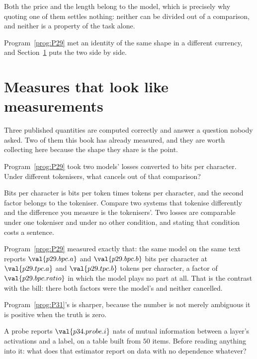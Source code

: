 \begin{fr}
Both the price and the length belong to the model, which is precisely why
quoting one of them settles nothing: neither can be divided out of a
comparison, and neither is a property of the task alone.

Program~\ref{prog:P29} met an identity of the same shape in a different
currency, and Section~\ref{sec:P34-measures} puts the two side by side.

\end{fr}

\section{Measures that look like measurements}
\label{sec:P34-measures}

\begin{fr}
Three published quantities are computed correctly and answer a question
nobody asked. Two of them this book has already measured, and they are worth
collecting here because the shape they share is the point.

Program~\ref{prog:P29} took two models' losses converted to bits per
character. Under different tokenisers, what cancels out of that comparison?
\dotline
\nextframe
\end{fr}

\begin{fr}

Bits per character is bits per token times tokens per character, and the
second factor belongs to the tokeniser. Compare two systems that tokenise
differently and the difference you measure is the tokenisers'. Two losses
are comparable under one tokeniser and under no other condition, and stating
that condition costs a sentence.

Program~\ref{prog:P29} measured exactly that: the same model on the same
text reports $\val{p29.bpc.a}$ and $\val{p29.bpc.b}$ bits per character at
$\val{p29.tpc.a}$ and $\val{p29.tpc.b}$ tokens per character, a factor of
$\val{p29.bpc.ratio}$ in which the model plays no part at all. That is the
contrast with the bill: there both factors were the model's and neither
cancelled.
\end{fr}

\begin{fr}
Program~\ref{prog:P31}'s is sharper, because the number is not merely
ambiguous \dash{} it is positive when the truth is zero.

A probe reports $\val{p34.probe.i}$ nats of mutual information between a
layer's activations and a label, on a table built from $50$ items. Before
reading anything into it: what does that estimator report on data with no
dependence whatever?
\dotline
\nextframe
\end{fr}

